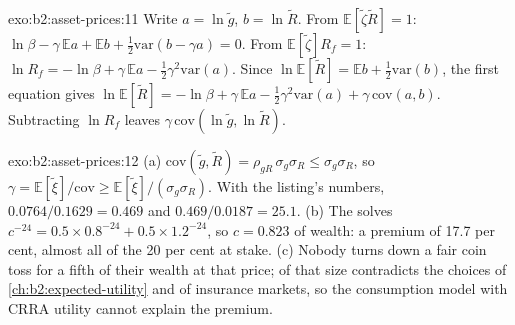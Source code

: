 \begin{solution}{exo:b2:asset-prices:11}
Write $a = \ln\tilde g$, $b = \ln\tilde R$. From $\mathbb{E}[\tilde\zeta\tilde R] = 1$:
$\ln\beta - \gamma\,\mathbb{E}a + \mathbb{E}b + \tfrac12\mathrm{var}(b - \gamma a) = 0$. From
$\mathbb{E}[\tilde\zeta]R_f = 1$: $\ln R_f = -\ln\beta + \gamma\,\mathbb{E}a - \tfrac12\gamma^2\mathrm{var}(a)$.
Since $\ln\mathbb{E}[\tilde R] = \mathbb{E}b + \tfrac12\mathrm{var}(b)$, the first equation gives
$\ln\mathbb{E}[\tilde R] = -\ln\beta + \gamma\,\mathbb{E}a - \tfrac12\gamma^2\mathrm{var}(a) +
\gamma\,\mathrm{cov}(a, b)$. Subtracting $\ln R_f$ leaves $\gamma\,\mathrm{cov}(\ln\tilde g, \ln\tilde
R)$.
\end{solution}

\begin{solution}{exo:b2:asset-prices:12}
(a) $\mathrm{cov}(\tilde g, \tilde R) = \rho_{gR}\,\sigma_g\sigma_R \le \sigma_g\sigma_R$, so $\gamma =
\mathbb{E}[\tilde\xi]/\mathrm{cov} \ge \mathbb{E}[\tilde\xi]/(\sigma_g\sigma_R)$. With the listing's
numbers, $0.0764/0.1629 = 0.469$ and $0.469/0.0187 = 25.1$. (b) The  solves $c^{-24}
= 0.5 \times 0.8^{-24} + 0.5 \times 1.2^{-24}$, so $c = 0.823$ of wealth: a premium of 17.7 per cent,
almost all of the 20 per cent at stake. (c) Nobody turns down a fair coin toss for a fifth of their
wealth at that price;  of that size contradicts the choices of \cref{ch:b2:expected-utility}
and of insurance markets, so the consumption model with CRRA utility cannot explain the premium.
\end{solution}

